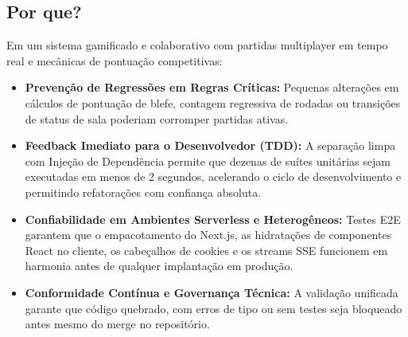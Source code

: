 \documentclass[12pt,a4paper]{article}
\begin{document}
\subsection{Por que?}
Em um sistema gamificado e colaborativo com partidas multiplayer em tempo real e mecânicas de pontuação competitivas:
\begin{itemize}
  \item \textbf{Prevenção de Regressões em Regras Críticas:} Pequenas alterações em cálculos de pontuação de blefe, contagem regressiva de rodadas ou transições de status de sala poderiam corromper partidas ativas.
  \item \textbf{Feedback Imediato para o Desenvolvedor (TDD):} A separação limpa com Injeção de Dependência permite que dezenas de suítes unitárias sejam executadas em menos de 2 segundos, acelerando o ciclo de desenvolvimento e permitindo refatorações com confiança absoluta.
  \item \textbf{Confiabilidade em Ambientes Serverless e Heterogêneos:} Testes E2E garantem que o empacotamento do Next.js, as hidratações de componentes React no cliente, os cabeçalhos de cookies e os streams SSE funcionem em harmonia antes de qualquer implantação em produção.
  \item \textbf{Conformidade Contínua e Governança Técnica:} A validação unificada garante que código quebrado, com erros de tipo ou sem testes seja bloqueado antes mesmo do merge no repositório.
\end{itemize}
\end{document}
